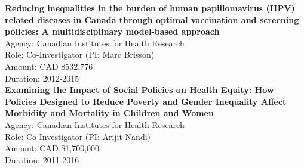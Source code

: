 \documentclass[
  letterpaper,
  DIV=11,
  numbers=noendperiod]{scrartcl}
\begin{document}
\textbf{Reducing inequalities in the burden of human papillomavirus
(HPV) related diseases in Canada through optimal vaccination and
screening policies: A multidisciplinary model-based approach}\\
\hspace*{0.333em}\hspace*{0.333em}\hspace*{0.333em}\hspace*{0.333em}Agency:
Canadian Institutes for Health Research\\
\hspace*{0.333em}\hspace*{0.333em}\hspace*{0.333em}\hspace*{0.333em}Role:
Co-Investigator (PI: Marc Brisson)\\
\hspace*{0.333em}\hspace*{0.333em}\hspace*{0.333em}\hspace*{0.333em}Amount:
CAD \$532,776\\
\hspace*{0.333em}\hspace*{0.333em}\hspace*{0.333em}\hspace*{0.333em}Duration:
2012-2015\\

\textbf{Examining the Impact of Social Policies on Health Equity: How
Policies Designed to Reduce Poverty and Gender Inequality Affect
Morbidity and Mortality in Children and Women}\\
\hspace*{0.333em}\hspace*{0.333em}\hspace*{0.333em}\hspace*{0.333em}Agency:
Canadian Institutes for Health Research\\
\hspace*{0.333em}\hspace*{0.333em}\hspace*{0.333em}\hspace*{0.333em}Role:
Co-Investigator (PI: Arijit Nandi)\\
\hspace*{0.333em}\hspace*{0.333em}\hspace*{0.333em}\hspace*{0.333em}Amount:
CAD \$1,700,000\\
\hspace*{0.333em}\hspace*{0.333em}\hspace*{0.333em}\hspace*{0.333em}Duration:
2011-2016\\
\end{document}
